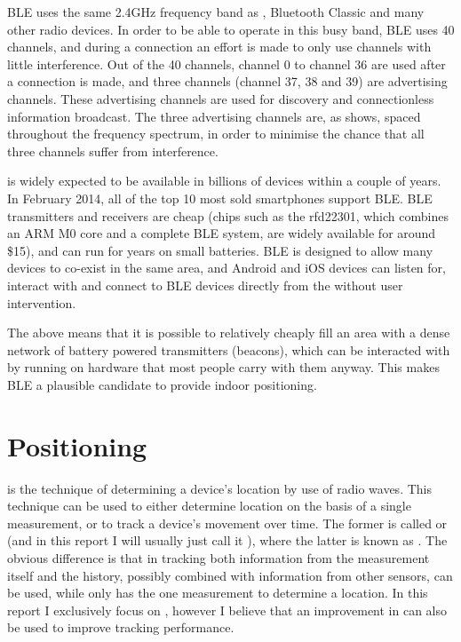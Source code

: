 
BLE uses the same 2.4GHz frequency band as \wifi, Bluetooth Classic and many other radio devices.
In order to be able to operate in this busy band, BLE uses 40 channels, and during a connection an effort is made to only use channels with little interference.
Out of the 40 channels, channel 0 to channel 36 are used after a connection is made, and three channels (channel 37, 38 and 39) are advertising channels.
These advertising channels are used for discovery and connectionless information broadcast.
The three advertising channels are, as  shows, spaced throughout the frequency spectrum, in order to minimise the chance that all three channels suffer from interference\citep{heydon2013bluetooth}.


\BLE is widely expected to be available in billions of devices within a couple of years.
In February 2014, all of the top 10 most sold smartphones support BLE.
BLE transmitters and receivers are cheap (chips such as the rfd22301, which combines an ARM M0 core and a complete BLE system, are widely available for around \$15), and can run for years on small batteries.
BLE is designed to allow many devices to co-exist in the same area\citep{heydon2013bluetooth}, and Android and iOS devices can listen for, interact with and connect to BLE devices directly from the \app without user intervention.

The above means that it is possible to relatively cheaply fill an area with a dense network of battery powered \BLE transmitters (beacons), which can be interacted with by \apps running on hardware that most people carry with them anyway.
This makes BLE a plausible candidate to provide indoor positioning.

\section{Positioning}
 is the technique of determining a device's location by use of radio waves.
This technique can be used to either determine location on the basis of a single measurement, or to track a device's movement over time.
The former is called  or  (and in this report I will usually just call it ), where the latter is known as .
The obvious difference is that in tracking both information from the measurement itself and the history, possibly combined with information from other sensors, can be used, while \ptfp only has the one measurement to determine a location.
In this report I exclusively focus on \ptfp, however I believe that an improvement in \ptfp can also be used to improve tracking performance.

